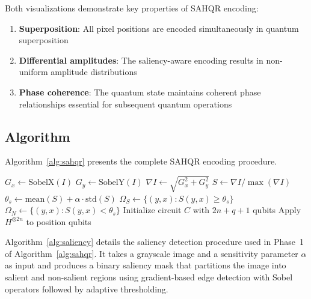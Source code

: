 \documentclass{ipol}
\begin{document}
Both visualizations demonstrate key properties of SAHQR encoding:
\begin{enumerate}
\item \textbf{Superposition}: All pixel positions are encoded simultaneously in quantum superposition
\item \textbf{Differential amplitudes}: The saliency-aware encoding results in non-uniform amplitude distributions
\item \textbf{Phase coherence}: The quantum state maintains coherent phase relationships essential for subsequent quantum operations
\end{enumerate}

\subsection{Algorithm}

Algorithm~\ref{alg:sahqr} presents the complete SAHQR encoding procedure.

\begin{algorithm}[!htbp]
\caption{SAHQR: Saliency-Aware Hybrid Quantum Image Representation}\label{alg:sahqr}
\BlankLine
{}
$G_x \gets \text{SobelX}(I)$\;
$G_y \gets \text{SobelY}(I)$\;
$\nabla I \gets \sqrt{G_x^2 + G_y^2}$\;
$S \gets \nabla I / \max(\nabla I)$\;
\BlankLine
{}
$\theta_s \gets \text{mean}(S) + \alpha \cdot \text{std}(S)$\;
$\Omega_S \gets \{(y,x) : S(y,x) \geq \theta_s\}$\;
$\Omega_N \gets \{(y,x) : S(y,x) < \theta_s\}$\;
\BlankLine
{}
Initialize circuit $C$ with $2n + q + 1$ qubits\;
Apply $H^{\otimes 2n}$ to position qubits\;
\BlankLine
{}
\BlankLine
{}
\BlankLine
{}\;
\end{algorithm}

\clearpage

Algorithm~\ref{alg:saliency} details the saliency detection procedure used in Phase~1 of Algorithm~\ref{alg:sahqr}. It takes a grayscale image and a sensitivity parameter $\alpha$ as input and produces a binary saliency mask that partitions the image into salient and non-salient regions using gradient-based edge detection with Sobel operators followed by adaptive thresholding.
\end{document}

